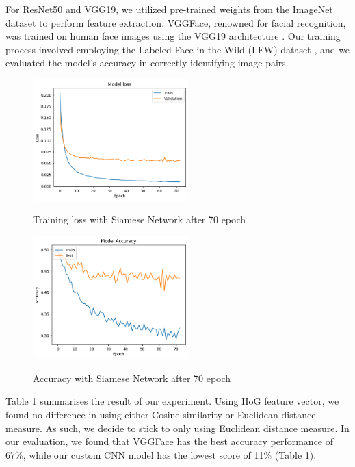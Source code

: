 \documentclass{article}
\begin{document}
For ResNet50 and VGG19, we utilized pre-trained weights from the ImageNet dataset \cite{imagenet_cvpr09} to perform feature extraction. VGGFace, renowned for facial recognition, was trained on human face images using the VGG19 architecture \cite{parkhi2015deep}. Our training process involved employing the Labeled Face in the Wild (LFW) dataset \cite{lfwTech}, and we evaluated the model's accuracy in correctly identifying image pairs.

\begin{figure}[tbh]
    \begin{center}
        \includegraphics[width=6cm]{simese-network-training-loss.png}\
        \caption{Training loss with Siamese Network after 70 epoch\label{figure2}} 
    \end{center}
\end{figure}

\begin{figure}[tbh]
    \begin{center}
        \includegraphics[width=6cm]{simense-network-training-acc.png}\
        \caption{Accuracy with Siamese Network after 70 epoch\label{figure2}} 
    \end{center}
\end{figure}

Table 1 summarises the result of our experiment. Using HoG feature vector, we found no difference in using either Cosine similarity or Euclidean distance measure. As such, we decide to stick to only using Euclidean distance measure. In our evaluation, we found that VGGFace has the best accuracy performance of 67\%, while our custom CNN model has the lowest score of 11\% (Table 1). 
\end{document}
